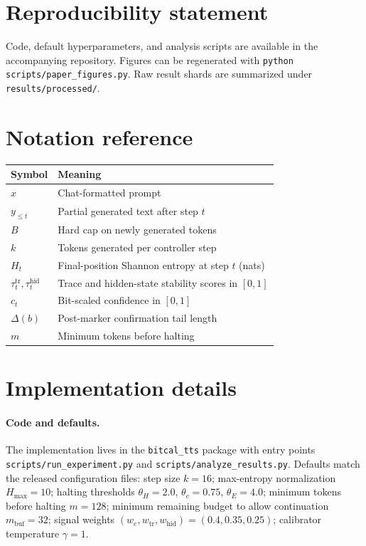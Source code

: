 \documentclass[11pt]{article}
\begin{document}
\section*{Reproducibility statement}
Code, default hyperparameters, and analysis scripts are available in the accompanying repository. Figures can be regenerated with \texttt{python scripts/paper\_figures.py}. Raw result shards are summarized under \texttt{results/processed/}.




\appendix

\section{Notation reference}
\begin{table}[h]
\centering
\begin{tabular}{@{}ll@{}}
\toprule
Symbol & Meaning \\
\midrule
$x$ & Chat-formatted prompt \\
$y_{\le t}$ & Partial generated text after step $t$ \\
$B$ & Hard cap on newly generated tokens \\
$k$ & Tokens generated per controller step \\
$H_t$ & Final-position Shannon entropy at step $t$ (nats) \\
$\tau^{\mathrm{tr}}_t,\tau^{\mathrm{hid}}_t$ & Trace and hidden-state stability scores in $[0,1]$ \\
$c_t$ & Bit-scaled confidence in $[0,1]$ \\
$\Delta(b)$ & Post-marker confirmation tail length \\
$m$ & Minimum tokens before halting \\
\bottomrule
\end{tabular}
\end{table}

\section{Implementation details}
\label{app:impl}
\paragraph{Code and defaults.}
The implementation lives in the \texttt{bitcal\_tts} package with entry points \texttt{scripts/run\_experiment.py} and \texttt{scripts/analyze\_results.py}. Defaults match the released configuration files: step size $k{=}16$; max-entropy normalization $H_{\max}{=}10$; halting thresholds $\theta_H{=}2.0$, $\theta_c{=}0.75$, $\theta_E{=}4.0$; minimum tokens before halting $m{=}128$; minimum remaining budget to allow continuation $m_{\mathrm{buf}}{=}32$; signal weights $(w_e,w_{\mathrm{tr}},w_{\mathrm{hid}}){=}(0.4,0.35,0.25)$; calibrator temperature $\gamma{=}1$.
\end{document}
